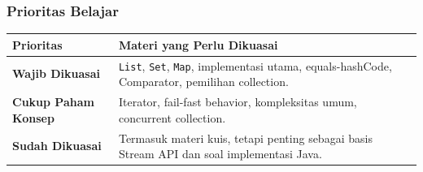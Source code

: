 \subsubsection{Prioritas Belajar}

\begin{tabularx}{\textwidth}{|L{0.22\textwidth}|X|}
\hline
\textbf{Prioritas} & \textbf{Materi yang Perlu Dikuasai} \\
\hline
\textbf{Wajib Dikuasai} & \texttt{List}, \texttt{Set}, \texttt{Map}, implementasi utama, equals-hashCode, Comparator, pemilihan collection. \\
\hline
\textbf{Cukup Paham Konsep} & Iterator, fail-fast behavior, kompleksitas umum, concurrent collection. \\
\hline
\textbf{Sudah Dikuasai} & Termasuk materi kuis, tetapi penting sebagai basis Stream API dan soal implementasi Java. \\
\hline
\end{tabularx}
